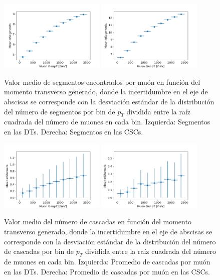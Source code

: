 \begin{figure}[h!]
\centering
\includegraphics[width=0.45\textwidth]{figures/data_genpt_DT_MeanNSegments.png}
\includegraphics[width=0.45\textwidth]{figures/data_genpt_CSC_MeanNSegments.png}
\caption{Valor medio de segmentos encontrados por mu\'on en funci\'on del momento transverso generado, donde la incertidumbre en el eje de abscisas se corresponde con la desviación est\'andar de la distribuci\'on del n\'umero de segmentos por bin de $p_{T}$ dividida entre la ra\'iz cuadrada del n\'umero de muones en cada bin. Izquierda: Segmentos en las DTs. Derecha: Segmentos en las CSCs.}
\label{fig:data_nSegmentsMean}        
\end{figure}

\begin{figure}[h!]
\centering
\includegraphics[width=0.45\textwidth]{figures/data_genpt_DT_MeanNshowers.png}
\includegraphics[width=0.45\textwidth]{figures/data_genpt_CSC_MeanNshowers.png}
\caption{Valor medio del n\'umero de cascadas en funci\'on del momento transverso generado, donde la incertidumbre en el eje de abscisas se corresponde con la desviación est\'andar de la distribuci\'on del n\'umero de cascadas por bin de $p_{T}$ dividida entre la ra\'iz cuadrada del n\'umero de muones en cada bin. Izquierda: Promedio de cascadas por mu\'on en las DTs. Derecha: Promedio de cascadas por mu\'on en las CSCs.}
\label{fig:data_nShowersMean_genpt}        
\end{figure}

